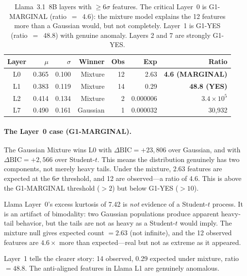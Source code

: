 \documentclass[11pt,a4paper]{article}
\newcommand{\DBIC}{\Delta\text{BIC}}
\begin{document}
\begin{table}[H]
\centering
\caption{Llama~3.1~8B layers with $\geq 6\sigma$ features. The critical Layer~0 is G1-MARGINAL (ratio~$=$~4.6): the mixture model explains the 12 features more than a Gaussian would, but not completely. Layer~1 is G1-YES (ratio~$=$~48.8) with genuine anomaly. Layers 2 and 7 are strongly G1-YES.}
\label{tab:llama_g1}
\small
\begin{tabular}{@{}crrrrrr@{}}
\toprule
Layer & $\mu$ & $\sigma$ & Winner & Obs & Exp & Ratio \\
\midrule
L0 & 0.365 & 0.100 & Mixture & 12 & 2.63 & \textbf{4.6 (MARGINAL)} \\
L1 & 0.383 & 0.119 & Mixture & 14 & 0.29 & \textbf{48.8 (YES)} \\
L2 & 0.414 & 0.134 & Mixture & 2  & 0.000006 & $3.4 \times 10^5$ \\
L7 & 0.490 & 0.161 & Gaussian & 1  & 0.000032 & 30,932 \\
\bottomrule
\end{tabular}
\end{table}

\paragraph{The Layer~0 case (G1-MARGINAL).} The Gaussian Mixture wins L0 with $\DBIC = +23{,}806$ over Gaussian, and with $\DBIC = +2{,}566$ over Student-$t$. This means the distribution genuinely has two components, not merely heavy tails. Under the mixture, 2.63 features are expected at the $6\sigma$ threshold, and 12 are observed---a ratio of 4.6. This is above the G1-MARGINAL threshold ($>2$) but below G1-YES ($>10$).

\begin{keyinsight}
Llama Layer~0's excess kurtosis of 7.42 is \emph{not} evidence of a Student-$t$ process. It is an artifact of bimodality: two Gaussian populations produce apparent heavy-tail behavior, but the tails are not as heavy as a Student-$t$ would imply. The mixture null gives expected count $= 2.63$ (not infinite), and the 12 observed features are $4.6\times$ more than expected---real but not as extreme as it appeared.

Layer~1 tells the clearer story: 14 observed, 0.29 expected under mixture, ratio $= 48.8$. The anti-aligned features in Llama L1 are genuinely anomalous.
\end{keyinsight}
\end{document}
